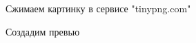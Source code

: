 Сжимаем картинку в сервисе "tinypng.com"

\noindent
\begin{minipage}{\linewidth}
\end{minipage}
\bigskip

\noindent
\begin{minipage}{\linewidth}
\end{minipage}
\bigskip

Создадим превью

\noindent
\begin{minipage}{\linewidth}
\end{minipage}
\bigskip

